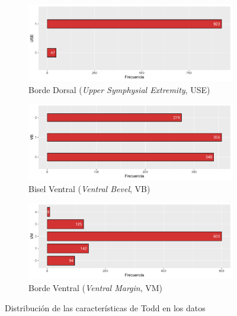 \begin{figure}
    \ContinuedFloat

    \begin{subfigure}{\textwidth}
        \includegraphics[width=\linewidth]{../../scripts/eda/eda_univar/char_use_distr.pdf}
        \caption{Borde Dorsal (\textit{Upper Symphysial Extremity}, USE)}
        \label{fig4:todd_chars__use}
    \end{subfigure}

    \begin{subfigure}{\textwidth}
        \includegraphics[width=\linewidth]{../../scripts/eda/eda_univar/char_vb_distr.pdf}
        \caption{Bisel Ventral (\textit{Ventral Bevel}, VB)}
        \label{fig4:todd_chars__vb}
    \end{subfigure}

    \begin{subfigure}{\textwidth}
        \includegraphics[width=\linewidth]{../../scripts/eda/eda_univar/char_vm_distr.pdf}
        \caption{Borde Ventral (\textit{Ventral Margin}, VM)}
        \label{fig4:todd_chars__vm}
    \end{subfigure}
    \caption[Distribución de las características de Todd]{Distribución de las características de Todd en los datos}

\end{figure}

